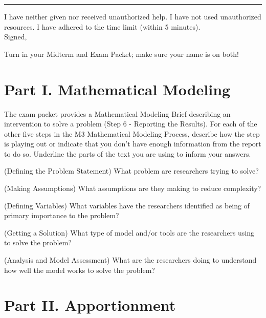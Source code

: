 \documentclass[12pt,addpoints]{exam}
\begin{document}
\vspace{15pt}

\hrule

\vspace{12pt}

\noindent I have neither given nor received unauthorized help. I have not used unauthorized resources. I have adhered to the time limit (within 5 minutes).\\[3em] Signed, \hrulefill\\[1em]

\vfill

Turn in your Midterm and Exam Packet; make sure your name is on both!

\clearpage


\section*{Part I. Mathematical Modeling}

	The exam packet provides a Mathematical Modeling Brief describing an intervention to solve a problem (Step 6 - Reporting the Results). For each of the other five steps in the M3 Mathematical Modeling Process, describe how the step is playing out or indicate that you don't have enough information from the report to do so. Underline the parts of the text you are using to inform your answers.
	  	
	\begin{questions}
		\question[5] 
			(Defining the Problem Statement) What problem are researchers trying to solve?
			\vfill

  	\question[5] 
  		(Making Assumptions) What assumptions are they making to reduce complexity?
  		\vfill

		\question[5] 
			(Defining Variables) What variables have the researchers identified as being of primary importance to the problem?
			\vfill

		\question[5] 
			(Getting a Solution) What type of model and/or tools are the researchers using to solve the problem?
			\vfill

		\question[5] 
			(Analysis and Model Assessment) What are the researchers doing to understand how well the model works to solve the problem?
			\vfill
	\end{questions}

\clearpage

\section*{Part II. Apportionment}
\end{document}
